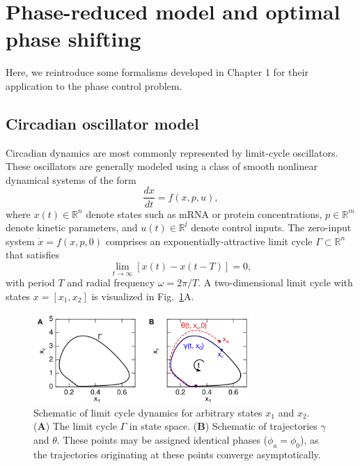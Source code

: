 \section{Phase-reduced model and optimal phase shifting \label{sec:form}}
Here, we reintroduce some formalisms developed in Chapter 1 for their application to the phase control problem.

\subsection*{Circadian oscillator model}
Circadian dynamics are most commonly represented by limit-cycle oscillators.
These oscillators are generally modeled using a class of smooth nonlinear dynamical systems of the form
\begin{equation}
    \label{eq:odes6}
    \frac{dx}{dt} = f(x, p, u),
\end{equation}
where $x(t)\in \mathbb{R}^n$ denote states such as mRNA or protein concentrations, $p\in \mathbb{R}^m$ denote kinetic parameters, and $u(t) \in \mathbb{R}^l$ denote control inputs.
The zero-input system $\dot{x}=f(x, p, 0)$ comprises an exponentially-attractive limit cycle $\Gamma \subset \mathbb{R}^n$ that satisfies
\begin{equation}
    \label{eq:lc6}
    \lim_{t\to\infty}[x(t) - x(t-T)]=0,
\end{equation}
with period $T$ and radial frequency $\omega = 2\pi/T$.
A two-dimensional limit cycle with states $x=[x_1,x_2]$ is visualized in Fig.~\ref{fig:-1}A.

\begin{figure}[p]
    \begin{center}
\includegraphics[width=8.4cm]{chap6/figures/figure_-1.png}    %
\end{center}
\caption{Schematic of limit cycle dynamics for arbitrary states $x_1$ and $x_2$.
		(\textbf{A}) The limit cycle $\Gamma$ in state space.
		(\textbf{B}) Schematic of trajectories $\gamma$ and $\theta$. These points may be assigned identical phases ($\phi_a = \phi_0$), as the trajectories originating at these points converge asymptotically.
        \label{fig:-1}  }                               %
\end{figure}

